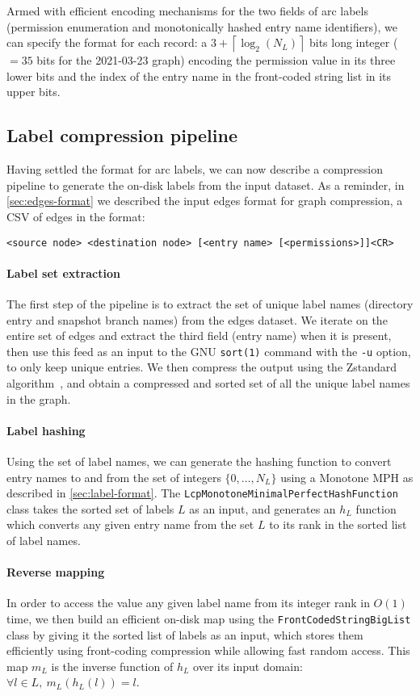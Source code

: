 Armed with efficient encoding mechanisms for the two fields of arc labels
(permission enumeration and monotonically hashed entry name identifiers), we
can specify the format for each record: a $3 +
\left\lceil{\log_2(N_L)}\right\rceil$ bits long integer ($= 35$ bits for
the 2021-03-23 graph) encoding the permission value in its three lower bits and
the index of the entry name in the front-coded string list in its upper bits.

\subsection{Label compression pipeline}

Having settled the format for arc labels, we can now describe a compression
pipeline to generate the on-disk labels from the input dataset. As a reminder,
in \cref{sec:edges-format} we described the input edges format for graph
compression, a CSV of edges in the format:

\texttt{<source node> <destination node> [<entry name> [<permissions>]]<CR>}

\paragraph{Label set extraction}
The first step of the pipeline is to extract the set of unique label names
(directory entry and snapshot branch names) from the edges dataset. We iterate
on the entire set of edges and extract the third field (entry name) when it is
present, then use this feed as an input to the GNU \texttt{sort(1)} command
with the \texttt{-u} option, to only keep unique entries. We then compress the
output using the Zstandard algorithm~\cite{collet2015zstd}, and obtain a
compressed and sorted set of all the unique label names in the graph.

\paragraph{Label hashing}
Using the set of label names, we can generate the hashing function to convert
entry names to and from the set of integers $\{0, \ldots, N_L\}$ using a
Monotone \gls{MPH} as described in \cref{sec:label-format}. The
\texttt{LcpMonotoneMinimalPerfectHashFunction} class takes the sorted set of
labels $L$ as an input, and generates an $h_L$ function which converts any
given entry name from the set $L$ to its rank in the sorted list of label
names.

\paragraph{Reverse mapping}
In order to access the value any given label name from its integer rank in
$O(1)$ time, we then build an efficient on-disk map using the
\texttt{FrontCodedStringBigList} class by giving it the sorted list of labels
as an input, which stores them efficiently using front-coding compression while
allowing fast random access. This map $m_L$ is the inverse function
of $h_L$ over its input domain: $\forall l \in L,~m_L(h_L(l)) = l$.

